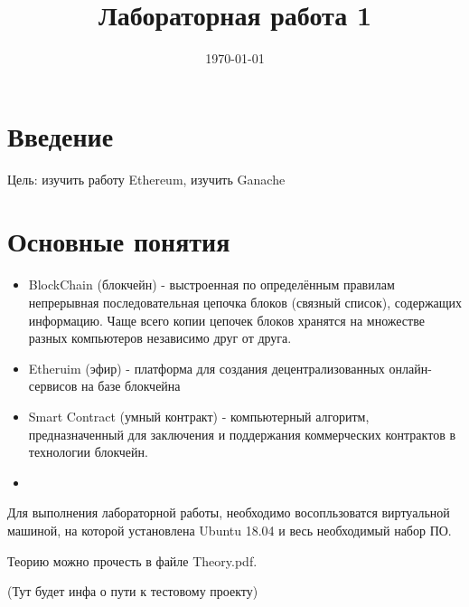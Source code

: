 \documentclass{article}
\begin{document}
\title{Лабораторная работа 1}

\date{\today}
\maketitle


\section{Введение}

Цель: изучить работу Ethereum, изучить Ganache


\section{Основные понятия}

\begin{itemize}
	\item BlockChain (блокчейн) - выстроенная по определённым правилам непрерывная последовательная цепочка блоков (связный список), содержащих информацию. Чаще всего копии цепочек блоков хранятся на множестве разных компьютеров независимо друг от друга. 
	\item Etheruim (эфир) -  платформа для создания децентрализованных онлайн-сервисов на базе блокчейна
	\item Smart Contract (умный контракт) - компьютерный алгоритм, предназначенный для заключения и поддержания коммерческих контрактов в технологии блокчейн. 
	\item 	
\end{itemize}





















Для выполнения лабораторной работы, необходимо восопльзоватся виртуальной машиной, на которой установлена Ubuntu 18.04 и весь необходимый набор ПО.

Теорию можно прочесть в файле Theory.pdf.

(Тут будет инфа о пути к тестовому проекту)
\end{document}
